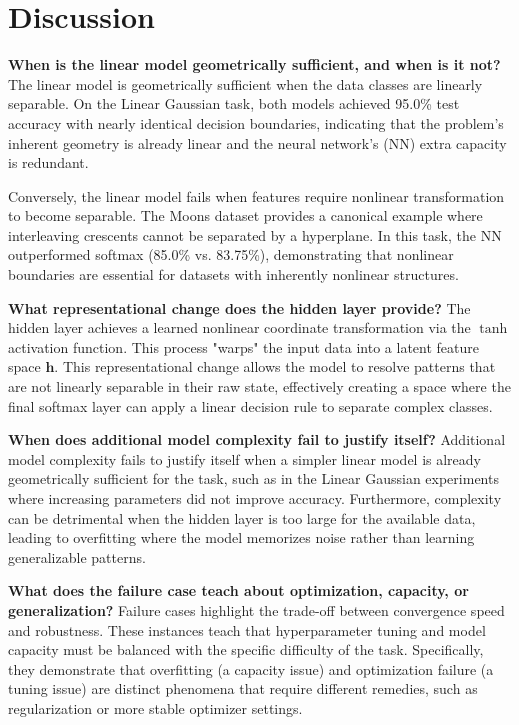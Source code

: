 \documentclass[sigconf,screen,nonacm]{acmart}
\newcommand{\vh}{\mathbf{h}}
\newcommand{\tanhact}{\tanh}
\begin{document}
\section{Discussion}

\noindent\textbf{When is the linear model geometrically sufficient, and when is it not?}
The linear model is geometrically sufficient when the data classes are linearly separable. On the Linear Gaussian task, both models achieved 95.0\% test accuracy with nearly identical decision boundaries, indicating that the problem's inherent geometry is already linear and the neural network's (NN) extra capacity is redundant. 

Conversely, the linear model fails when features require nonlinear transformation to become separable. The Moons dataset provides a canonical example where interleaving crescents cannot be separated by a hyperplane. In this task, the NN outperformed softmax (85.0\% vs. 83.75\%), demonstrating that nonlinear boundaries are essential for datasets with inherently nonlinear structures.

\medskip
\noindent\textbf{What representational change does the hidden layer provide?}
The hidden layer achieves a learned nonlinear coordinate transformation via the $\tanhact$ activation function. This process "warps" the input data into a latent feature space $\vh$. This representational change allows the model to resolve patterns that are not linearly separable in their raw state, effectively creating a space where the final softmax layer can apply a linear decision rule to separate complex classes.

\medskip
\noindent\textbf{When does additional model complexity fail to justify itself?}
Additional model complexity fails to justify itself when a simpler linear model is already geometrically sufficient for the task, such as in the Linear Gaussian experiments where increasing parameters did not improve accuracy. Furthermore, complexity can be detrimental when the hidden layer is too large for the available data, leading to overfitting where the model memorizes noise rather than learning generalizable patterns.

\medskip
\noindent\textbf{What does the failure case teach about optimization, capacity, or generalization?}
Failure cases highlight the trade-off between convergence speed and robustness. These instances teach that hyperparameter tuning and model capacity must be balanced with the specific difficulty of the task. Specifically, they demonstrate that overfitting (a capacity issue) and optimization failure (a tuning issue) are distinct phenomena that require different remedies, such as regularization or more stable optimizer settings.
\end{document}
